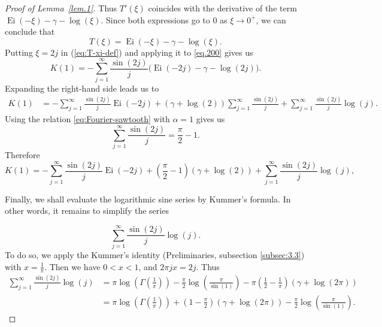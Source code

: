 \documentclass[preprint,12pt,nopreprintline]{elsarticle}
\begin{document}
\begin{proof}[Proof of Lemma~\ref{lem.1}]
Thus $T'(\xi)$ coincides with the derivative of the term $\operatorname{Ei}(-\xi)-\gamma-\log\left(\xi\right)$. Since both expressions go to $0$ as $\xi\to 0^+$, we can conclude that
\begin{equation}\label{eq:T-xi-closed}
T(\xi)=\operatorname{Ei}(-\xi)-\gamma-\log\left(\xi\right).
\end{equation}
Putting $\xi=2j$ in (\ref{eq:T-xi-def}) and applying it to \eqref{eq.200} gives us
\begin{equation}\label{eq:K1-after-Ei}
K(1)
=
-\sum_{j=1}^{\infty}\frac{\sin(2j)}{j}\bigl(\operatorname{Ei}(-2j)-\gamma-\log(2j)\bigr).
\end{equation}
Expanding the right-hand side leads us to
\begin{align}
K(1)
&=
-\sum_{j=1}^{\infty}\frac{\sin(2j)}{j}\operatorname{Ei}(-2j)
+
(\gamma+\log\left( 2\right))\sum_{j=1}^{\infty}\frac{\sin(2j)}{j}
+
\sum_{j=1}^{\infty}\frac{\sin(2j)}{j}\log \left(j\right).
\label{eq:K1-expanded}
\end{align}
Using the relation \eqref{eq:Fourier-sawtooth} with $\alpha=1$ gives us
\[
\sum_{j=1}^{\infty}\frac{\sin(2j)}{j}
=
\frac{\pi}{2}-1.
\]
Therefore
\begin{equation}\label{eq:K1-before-Kummer}
K(1)
=
-\sum_{j=1}^{\infty}\frac{\sin(2j)}{j}\operatorname{Ei}(-2j)
+
\left(\frac{\pi}{2}-1\right)(\gamma+\log \left(2\right))
+
\sum_{j=1}^{\infty}\frac{\sin(2j)}{j}\log \left(j\right),
\end{equation}

Finally, we shall evaluate the logarithmic sine series by Kummer’s formula. In other words, it remains to simplify the series

\[
\sum_{j=1}^{\infty}\frac{\sin(2j)}{j}\log \left(j\right).
\]
To do so, we apply the Kummer’s identity (Preliminaries, subsection \ref{subsec:3.3}) with $x=\frac{1}{\pi}$. Then we have $0<x<1$, and $2\pi j x = 2j$. Thus
\begin{align}
\sum_{j=1}^{\infty}\frac{\sin(2j)}{j}\log \left(j\right)
&=
\pi\log\left(\Gamma\!\left(\frac{1}{\pi}\right)\right)
-
\frac{\pi}{2}\log\!\left(\frac{\pi}{\sin \left(1\right)}\right)
-
\pi\left(\frac12-\frac{1}{\pi}\right)(\gamma+\log(2\pi))
\nonumber\\
&=
\pi\log\left(\Gamma\!\left(\frac{1}{\pi}\right)\right)
+
\left(1-\frac{\pi}{2}\right)(\gamma+\log(2\pi))
-
\frac{\pi}{2}\log\!\left(\frac{\pi}{\sin \left(1\right)}\right).
\label{eq:sine-log-Kummer}
\end{align}


\end{proof}
\end{document}
